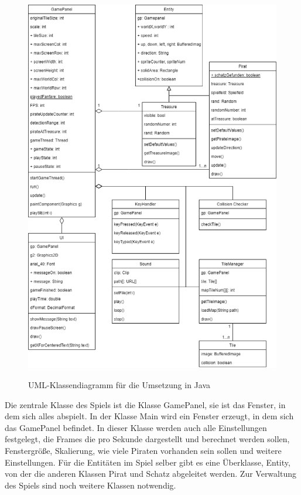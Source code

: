 \documentclass[
	12pt, %
	a4paper,
	listof=totoc, %
	bibliography=totoc, %
	numbers=noenddot, %
	ngerman, %
	headsepline, %
	oneside %
	]{scrbook} %
\begin{document}
\begin{figure}[H]
  \centering
  \includegraphics[scale=0.4]{bilder/UML_Klassendiagramm_Java.png}
  \label{fig:UML_Klassendiagramm_Java}       %
  \caption[UML-Klassendiagramm für die Umsetzung in Java]{UML-Klassendiagramm für die Umsetzung in Java}    %
\end{figure}

Die zentrale Klasse des Spiels ist die Klasse GamePanel, sie ist das Fenster, in dem sich alles abspielt. In der Klasse Main wird ein Fenster erzeugt, in dem sich das GamePanel befindet. In dieser Klasse werden auch alle Einstellungen festgelegt, die Frames die pro Sekunde dargestellt und berechnet werden sollen, Fenstergröße, Skalierung, wie viele Piraten vorhanden sein sollen und weitere Einstellungen.  
Für die Entitäten im Spiel selber gibt es eine Überklasse, Entity, von der die anderen Klassen Pirat und Schatz abgeleitet werden.  
Zur Verwaltung des Spiels sind noch weitere Klassen notwendig.
\end{document}
